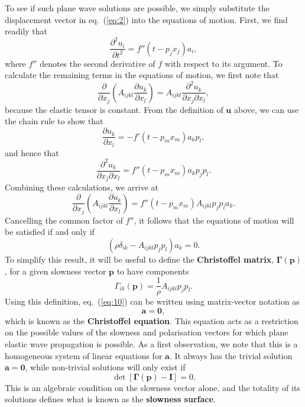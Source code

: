 To see if such plane wave solutions are possible, we simply substitute the displacement vector in eq.~(\ref{eq:2}) into the equations 
 of motion. First, we find readily that
\begin{equation}
\frac{\partial^{2}u_{i}}{\partial t^{2}}=f''(t-p_{j}x_{j})a_{i},
\label{eq:5}
\end{equation}
where $f''$ denotes the second derivative of $f$ with respect to its argument. To calculate the remaining terms in the equations 
of motion, we first note that
\begin{equation}
\frac{\partial}{\partial x_{j}}\left(A_{ijkl}\frac{\partial u_{k}}{\partial x_{l}}\right)=A_{ijkl}\frac{\partial^{2}u_{k}}{\partial x_{j}\partial x_{l}},
\label{eq:6}
\end{equation}
because the elastic tensor is constant. From the definition of $\mathbf{u}$ above, we can use the chain rule to show that
\begin{equation}
\frac{\partial u_{k}}{\partial x_{l}}=-f'(t-p_{m}x_{m})a_{k}p_{l},
\label{eq:7}
\end{equation}
and hence that
\begin{equation}
\frac{\partial^{2}u_{k}}{\partial x_{j}\partial x_{l}}=f''(t-p_{m}x_{m})a_{k}p_{j}p_{l}.
\label{eq:8}
\end{equation}
Combining these calculations, we arrive at
\begin{equation}
\frac{\partial}{\partial x_{j}}\left(A_{ijkl}\frac{\partial u_{k}}{\partial x_{l}}\right)=f''(t-p_{m}x_{m})A_{ijkl}p_{j}p_{l}a_{k}.
\label{eq:9}
\end{equation}
Cancelling the common factor of $f''$, it follows that the equations of motion will be satisfied if and only if
\begin{equation}
(\rho\delta_{ik}-A_{ijkl}p_{j}p_{l})a_{k}=0.
\label{eq:10}
\end{equation}
To simplify this result, it will be useful to define the \textbf{Christoffel matrix}, $\bm{\Gamma}(\mathbf{p})$, 
for a given slowness vector $\mathbf{p}$ to have components
\begin{equation}
\Gamma_{ik}(\mathbf{p})=\frac{1}{\rho}A_{ijkl}p_{j}p_{l}.
\label{eq:11}
\end{equation}
Using this definition, eq.~(\ref{eq:10}) can be written using matrix-vector notation as
\begin{equation}
[\bm{\Gamma}(\mathbf{p})-\mathbf{I}]\mathbf{a}=\mathbf{0},
\label{eq:12}
\end{equation}
which is known as the \textbf{Christoffel equation}. This equation acts as a restriction on the possible values 
of the slowness and polarisation vectors for which plane elastic wave propagation is possible.
As a first observation, we note that this is a homogeneous system of linear equations for $\mathbf{a}$.
It always has the trivial solution $\mathbf{a}=\mathbf{0}$, while non-trivial solutions will only exist if
\begin{equation}
\det[\bm{\Gamma}(\mathbf{p})-\mathbf{I}]=0.
\label{eq:13}
\end{equation}
This is an algebraic condition on the slowness vector alone, and the totality of its solutions defines what is known as the \textbf{slowness surface}.

